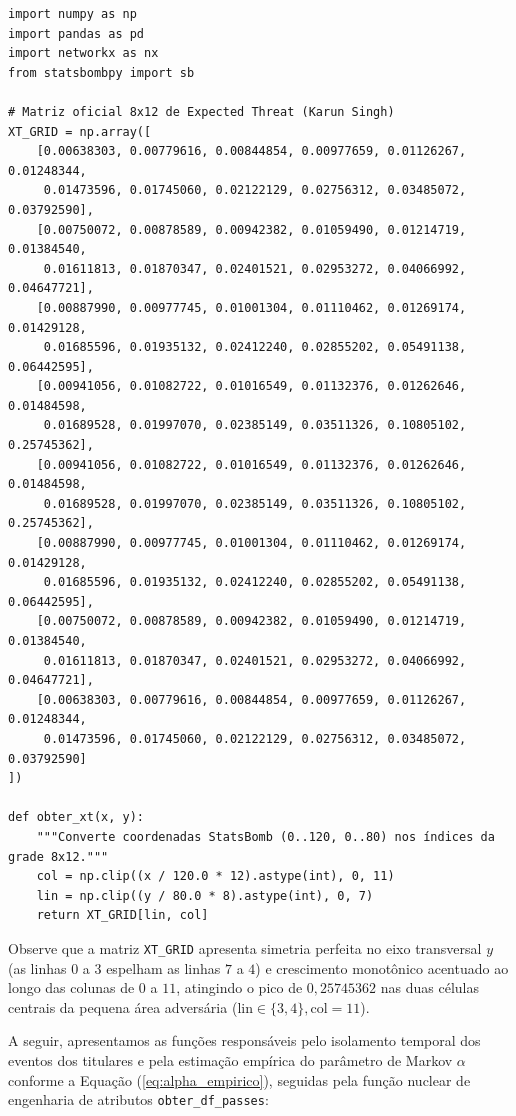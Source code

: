 \documentclass[10pt,a4paper]{article}
\theoremstyle{definition}
\theoremstyle{plain}
\theoremstyle{remark}
\begin{document}
\begin{lstlisting}[caption={Implementação da grade $8 \times 12$ de Expected Threat (xT) e mapeamento espacial.}]
import numpy as np
import pandas as pd
import networkx as nx
from statsbombpy import sb

# Matriz oficial 8x12 de Expected Threat (Karun Singh)
XT_GRID = np.array([
    [0.00638303, 0.00779616, 0.00844854, 0.00977659, 0.01126267, 0.01248344,
     0.01473596, 0.01745060, 0.02122129, 0.02756312, 0.03485072, 0.03792590],
    [0.00750072, 0.00878589, 0.00942382, 0.01059490, 0.01214719, 0.01384540,
     0.01611813, 0.01870347, 0.02401521, 0.02953272, 0.04066992, 0.04647721],
    [0.00887990, 0.00977745, 0.01001304, 0.01110462, 0.01269174, 0.01429128,
     0.01685596, 0.01935132, 0.02412240, 0.02855202, 0.05491138, 0.06442595],
    [0.00941056, 0.01082722, 0.01016549, 0.01132376, 0.01262646, 0.01484598,
     0.01689528, 0.01997070, 0.02385149, 0.03511326, 0.10805102, 0.25745362],
    [0.00941056, 0.01082722, 0.01016549, 0.01132376, 0.01262646, 0.01484598,
     0.01689528, 0.01997070, 0.02385149, 0.03511326, 0.10805102, 0.25745362],
    [0.00887990, 0.00977745, 0.01001304, 0.01110462, 0.01269174, 0.01429128,
     0.01685596, 0.01935132, 0.02412240, 0.02855202, 0.05491138, 0.06442595],
    [0.00750072, 0.00878589, 0.00942382, 0.01059490, 0.01214719, 0.01384540,
     0.01611813, 0.01870347, 0.02401521, 0.02953272, 0.04066992, 0.04647721],
    [0.00638303, 0.00779616, 0.00844854, 0.00977659, 0.01126267, 0.01248344,
     0.01473596, 0.01745060, 0.02122129, 0.02756312, 0.03485072, 0.03792590]
])

def obter_xt(x, y):
    """Converte coordenadas StatsBomb (0..120, 0..80) nos índices da grade 8x12."""
    col = np.clip((x / 120.0 * 12).astype(int), 0, 11)
    lin = np.clip((y / 80.0 * 8).astype(int), 0, 7)
    return XT_GRID[lin, col]
\end{lstlisting}

Observe que a matriz \texttt{XT\_GRID} apresenta simetria perfeita no eixo transversal $y$ (as linhas $0$ a $3$ espelham as linhas $7$ a $4$) e crescimento monotônico acentuado ao longo das colunas de $0$ a $11$, atingindo o pico de $0{,}25745362$ nas duas células centrais da pequena área adversária ($\text{lin} \in \{3, 4\}, \text{col} = 11$).

A seguir, apresentamos as funções responsáveis pelo isolamento temporal dos eventos dos titulares e pela estimação empírica do parâmetro de Markov $\alpha$ conforme a Equação (\ref{eq:alpha_empirico}), seguidas pela função nuclear de engenharia de atributos \texttt{obter\_df\_passes}:
\end{document}
